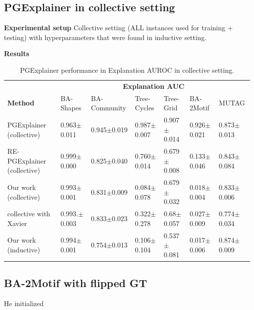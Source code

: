 \subsection{PGExplainer in collective setting}

\textbf{Experimental setup}
Collective setting (ALL instances used for training + testing) with hyperparameters that were found in inductive setting.

\textbf{Results}

\begin{table}[ht]
    \centering
    \scriptsize
    \begin{tabularx}{\textwidth}{l*{6}{X}}   %
    \toprule
    \textbf{} & \multicolumn{6}{c}{\textbf{Explanation AUC}} \\
    \cmidrule{2-7}
    \textbf{Method} & BA-Shapes & BA-Community & Tree-Cycles & Tree-Grid & BA-2Motif & MUTAG \\
    \midrule
    PGExplainer (collective) & 0.963$\pm$0.011 & 0.945$\pm$0.019 & 0.987$\pm$0.007 & 0.907$\pm$0.014 & 0.926$\pm$0.021 & 0.873$\pm$0.013 \\
    \midrule
    RE-PGExplainer (collective) & 0.999$\pm$0.000 & 0.825$\pm$0.040 & 0.760$\pm$0.014 & 0.679$\pm$0.008 & 0.133$\pm$0.046 & 0.843$\pm$0.084 \\
    \midrule
    Our work (collective) & 0.993$\pm$0.001 & 0.831$\pm$0.009 & 0.084$\pm$0.078 & 0.679$\pm$0.032 & 0.018$\pm$0.004 & 0.833$\pm$0.006 \\
    \midrule
    collective with Xavier & 0.993.$\pm$0.003 & 0.833$\pm$0.023 & 0.322$\pm$0.278 & 0.68$\pm$0.057 & 0.027$\pm$0.009 & 0.774$\pm$0.034 \\
    \midrule
    \midrule
    Our work (inductive) & 0.994$\pm$0.001 & 0.754$\pm$0.013 & 0.106$\pm$0.104 & 0.537$\pm$0.081 & 0.017$\pm$0.006 & 0.874$\pm$0.009 \\
    \bottomrule
    \end{tabularx}
    \caption[Collective performance of our reimplementation]{PGExplainer performance in Explanation AUROC in collective setting.}
    \label{tab:pgexplainer_auc}
\end{table}

\subsection{BA-2Motif with flipped GT}

He initialized

